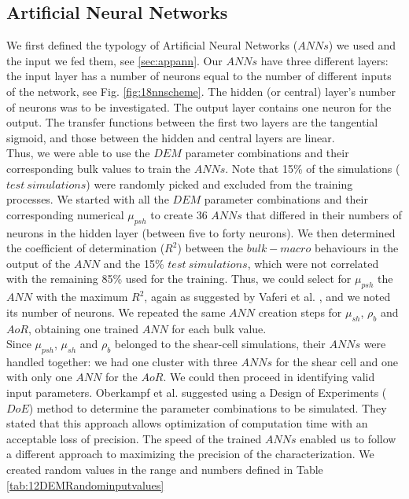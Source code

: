 \documentclass{llncs}
\begin{document}
\subsection{Artificial Neural Networks}
\label{subsec:ann}
We first defined the typology of Artificial Neural Networks ($ANNs$) we used and
the input we fed them, see \ref{sec:appann}.
Our $ANNs$ have three different layers: the input layer has a number of neurons
equal to the number of different inputs of the network, see Fig. \ref{fig:18nnscheme}.
The hidden (or central) layer's number of neurons was to be investigated. 
The output layer contains one neuron for the output.
The transfer functions between the first two layers are the tangential sigmoid, 
and those between the hidden and central layers are linear.\\
Thus, we were able to use the $DEM$ parameter combinations and their
corresponding bulk values to train the $ANNs$.
Note that 15\% of the simulations ($test ~ simulations$) were
randomly picked and excluded from the training processes.
We started with all the $DEM$ parameter combinations and their corresponding
numerical $\mu_{psh}$ to create 36 $ANNs$ that differed in their numbers of
neurons in the hidden layer (between five to forty neurons).
We then determined the coefficient of determination ($R^2$) between the
$bulk-macro$ behaviours in the output of the $ANN$ and the 15\% $test ~ simulations$, 
which were not correlated with the remaining 85\% used for the training. 
Thus, we could select for $\mu_{psh}$ the $ANN$ with the maximum $R^2$, 
again as suggested by Vaferi et al. \cite{RefWorks:150}, and we noted its number
of neurons.
We repeated the same $ANN$ creation steps for $\mu_{sh}$, $\rho_b$
and $AoR$, obtaining one trained $ANN$ for each bulk value. \\
Since $\mu_{psh}$, $\mu_{sh}$ and $\rho_b$ belonged to the shear-cell
simulations, their $ANNs$ were handled together: we had one cluster with three 
$ANNs$ for the shear cell and one with only one $ANN$ for the $AoR$.
We could then proceed in identifying valid input parameters.
Oberkampf et al. \cite{RefWorks:160} suggested using a Design of Experiments
($DoE$) method to determine the parameter combinations to be simulated.
They stated that this approach allows optimization of computation time
with an acceptable loss of precision.
The speed of the trained $ANNs$ enabled us to follow a different approach to
maximizing the precision of the characterization.
We created random values
in the range and numbers defined in Table \ref{tab:12DEMRandominputvalues}
\end{document}
